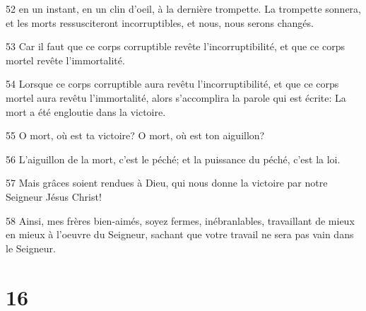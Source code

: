 \par 52 en un instant, en un clin d'oeil, à la dernière trompette. La trompette sonnera, et les morts ressusciteront incorruptibles, et nous, nous serons changés.
\par 53 Car il faut que ce corps corruptible revête l'incorruptibilité, et que ce corps mortel revête l'immortalité.
\par 54 Lorsque ce corps corruptible aura revêtu l'incorruptibilité, et que ce corps mortel aura revêtu l'immortalité, alors s'accomplira la parole qui est écrite: La mort a été engloutie dans la victoire.
\par 55 O mort, où est ta victoire? O mort, où est ton aiguillon?
\par 56 L'aiguillon de la mort, c'est le péché; et la puissance du péché, c'est la loi.
\par 57 Mais grâces soient rendues à Dieu, qui nous donne la victoire par notre Seigneur Jésus Christ!
\par 58 Ainsi, mes frères bien-aimés, soyez fermes, inébranlables, travaillant de mieux en mieux à l'oeuvre du Seigneur, sachant que votre travail ne sera pas vain dans le Seigneur.

\chapter{16}

